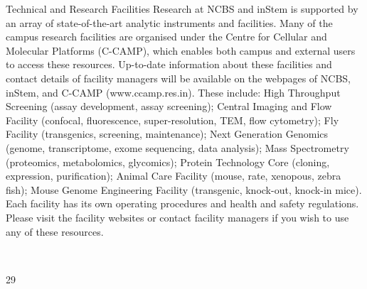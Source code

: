 \documentclass[a4paper,10pt]{article}
\begin{document}
Technical and Research Facilities
Research at NCBS and inStem is supported by an array of state-of-the-art analytic
instruments and facilities. Many of the campus research facilities are organised under the
Centre for Cellular and Molecular Platforms (C-CAMP), which enables both campus and
external users to access these resources. Up-to-date information about these facilities and
contact details of facility managers will be available on the webpages of NCBS, inStem, and
C-CAMP (www.ccamp.res.in). These include: High Throughput Screening (assay
development, assay screening); Central Imaging and Flow Facility (confocal, fluorescence,
super-resolution, TEM, flow cytometry); Fly Facility (transgenics, screening, maintenance);
Next Generation Genomics (genome, transcriptome, exome sequencing, data analysis);
Mass Spectrometry (proteomics, metabolomics, glycomics); Protein Technology Core
(cloning, expression, purification); Animal Care Facility (mouse, rate, xenopous, zebra fish);
Mouse Genome Engineering Facility (transgenic, knock-out, knock-in mice). Each facility
has its own operating procedures and health and safety regulations. Please visit the facility
websites or contact facility managers if you wish to use any of these resources.

	
  

29	
  
\end{document}
